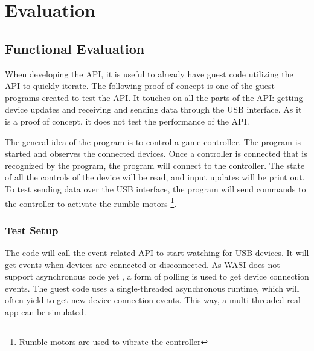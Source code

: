 \chapter{Evaluation}

\section{Functional Evaluation}
\label{section:functional_evaluation}
When developing the API, it is useful to already have guest code utilizing the API to quickly iterate. The following proof of concept is one of the guest programs created to test the API. It touches on all the parts of the API: getting device updates and receiving and sending data through the USB interface. As it is a proof of concept, it does not test the performance of the API.

The general idea of the program is to control a game controller. The program is started and observes the connected devices. Once a controller is connected that is recognized by the program, the program will connect to the controller. The state of all the controls of the device will be read, and input updates will be print out. To test sending data over the USB interface, the program will send commands to the controller to activate the rumble motors \footnote{Rumble motors are used to vibrate the controller}.

\subsection{Test Setup}
The code will call the event-related API to start watching for USB devices. It will get events when devices are connected or disconnected. As WASI does not support asynchronous code yet \cite{wasi_roadmap}, a form of polling is used to get device connection events. The guest code uses a single-threaded asynchronous runtime, which will often yield to get new device connection events. This way, a multi-threaded real app can be simulated.

